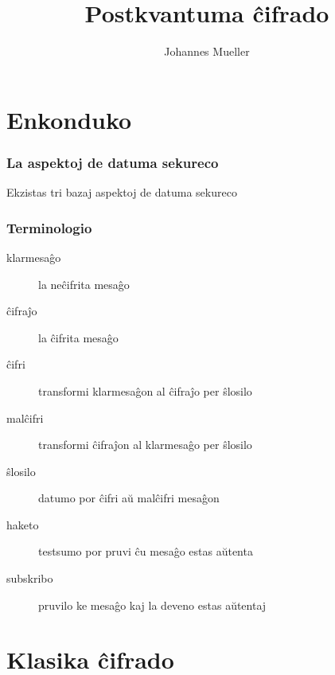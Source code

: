 \documentclass[utf8, aspectratio=169]{beamer}
\title{Postkvantuma ĉifrado}
\author{Johannes Mueller}
\institute{KAEST 2024 – Žilina}
\begin{document}
\begin{frame}
  \titlepage
\end{frame}

\section{Enkonduko}

\begin{frame}
  \frametitle{La aspektoj de datuma sekureco}

  Ekzistas tri bazaj aspektoj de datuma sekureco

  \begin{description}
  \item<2->[konfidenteco] 
  \item<3->[fidindeco] 
  \item<4->[disponeblo] 
  \end{description}
\end{frame}

\begin{frame}
  \frametitle{Terminologio}
  \begin{description}
  \item[klarmesaĝo] la neĉifrita mesaĝo
  \item[ĉifraĵo] la ĉifrita mesaĝo
  \item[ĉifri] transformi klarmesaĝon al ĉifraĵo per ŝlosilo
  \item[malĉifri] transformi ĉifraĵon al klarmesaĝo per ŝlosilo
  \item[ŝlosilo] datumo por ĉifri aŭ malĉifri mesaĝon
  \item[haketo] testsumo por pruvi ĉu mesaĝo estas aŭtenta
  \item[subskribo] pruvilo ke mesaĝo kaj la deveno estas aŭtentaj
  \end{description}
\end{frame}


\section{Klasika ĉifrado}
\end{document}
